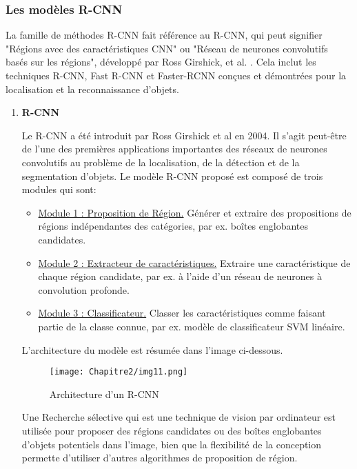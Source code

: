     
\subsubsection{Les modèles R-CNN}  
La famille de méthodes R-CNN fait référence au R-CNN, qui peut signifier "Régions avec des caractéristiques CNN" ou "Réseau de neurones convolutifs basés sur les régions", développé par Ross Girshick, et al. \cite{rcnn_paper}.  Cela inclut les techniques R-CNN, Fast R-CNN et Faster-RCNN conçues et démontrées pour la localisation et la reconnaissance d'objets.

\begin{enumerate}
 \item  \textbf{R-CNN}\cite{rcnn_paper}
 
Le R-CNN a été introduit par Ross Girshick et al en 2004. Il s'agit peut-être de l'une des premières applications importantes des réseaux de neurones convolutifs au problème de la localisation, de la détection et de la segmentation d'objets. Le modèle R-CNN proposé est composé de trois modules qui sont:
\begin{itemize}
\item \underline{Module 1 : Proposition de Région.} Générer et extraire des propositions de régions indépendantes des catégories, par ex. boîtes englobantes candidates.\\

\item \underline{Module 2 : Extracteur de caractéristiques.} Extraire une caractéristique de chaque région candidate, par ex. à l'aide d'un réseau de neurones à convolution profonde.\\

\item \underline{Module 3 : Classificateur.} Classer les caractéristiques comme faisant partie de la classe connue, par ex. modèle de classificateur SVM linéaire.\\
\end{itemize}
 
L'architecture du modèle est résumée dans l'image ci-dessous.
 \begin{figure}[H]
          \centering
          \texttt{[image: Chapitre2/img11.png]}
          \caption{Architecture d'un R-CNN \cite{rcnn_paper}}
          \label{img11}
          \end{figure}

Une Recherche sélective qui est une technique de vision par ordinateur est utilisée pour proposer des régions candidates ou des boîtes englobantes d'objets potentiels dans l'image, bien que la flexibilité de la conception permette d'utiliser d'autres algorithmes de proposition de région.


\end{enumerate}
